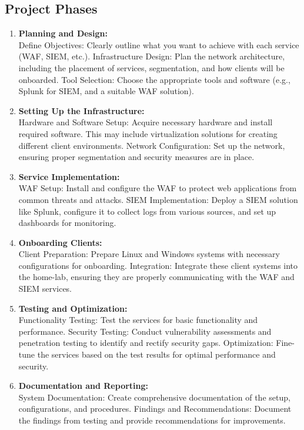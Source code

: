 \documentclass{article}
\begin{document}
\begin{enumerate}
		\subsection*{Project Phases}
		\begin{enumerate}
			\item \textbf{Planning and Design:}\\
			Define Objectives: Clearly outline what you want to achieve with each service (WAF, SIEM, etc.).
			Infrastructure Design: Plan the network architecture, including the placement of services, segmentation, and how clients will be onboarded.
			Tool Selection: Choose the appropriate tools and software (e.g., Splunk for SIEM, and a suitable WAF solution).
			\item \textbf{Setting Up the Infrastructure:}\\
			Hardware and Software Setup: Acquire necessary hardware and install required software. This may include virtualization solutions for creating different client environments.
			Network Configuration: Set up the network, ensuring proper segmentation and security measures are in place.
			\item \textbf{Service Implementation:}\\
			WAF Setup: Install and configure the WAF to protect web applications from common threats and attacks.
			SIEM Implementation: Deploy a SIEM solution like Splunk, configure it to collect logs from various sources, and set up dashboards for monitoring.
			\item \textbf{Onboarding Clients:}\\
			Client Preparation: Prepare Linux and Windows systems with necessary configurations for onboarding.
			Integration: Integrate these client systems into the home-lab, ensuring they are properly communicating with the WAF and SIEM services.
			\item \textbf{Testing and Optimization:}\\
			Functionality Testing: Test the services for basic functionality and performance.
			Security Testing: Conduct vulnerability assessments and penetration testing to identify and rectify security gaps.
			Optimization: Fine-tune the services based on the test results for optimal performance and security.
			\item \textbf{Documentation and Reporting:}\\
			System Documentation: Create comprehensive documentation of the setup, configurations, and procedures.
			Findings and Recommendations: Document the findings from testing and provide recommendations for improvements.

\end{enumerate}
\end{enumerate}
\end{document}
